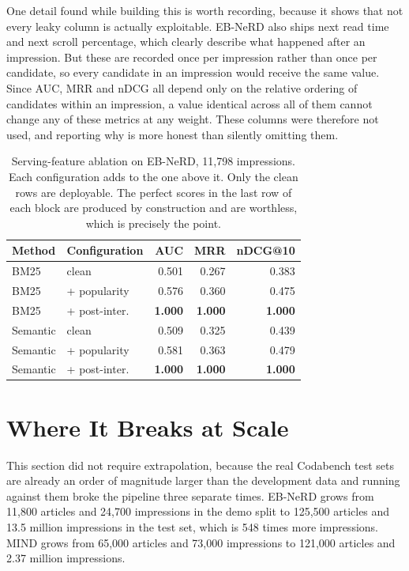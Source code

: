 \documentclass[11pt]{article}
\begin{document}
One detail found while building this is worth recording, because it shows that not every leaky
column is actually exploitable. EB-NeRD also ships next read time and next scroll percentage,
which clearly describe what happened after an impression. But these are recorded once per
impression rather than once per candidate, so every candidate in an impression would receive
the same value. Since AUC, MRR and nDCG all depend only on the relative ordering of candidates
within an impression, a value identical across all of them cannot change any of these metrics
at any weight. These columns were therefore not used, and reporting why is more honest than
silently omitting them.

\begin{table}[t]
\centering
\small
\begin{tabular}{llrrr}
\toprule
Method & Configuration & AUC & MRR & nDCG@10 \\
\midrule
BM25     & clean            & 0.501 & 0.267 & 0.383 \\
BM25     & + popularity     & 0.576 & 0.360 & 0.475 \\
BM25     & + post-inter.    & \textbf{1.000} & \textbf{1.000} & \textbf{1.000} \\
\midrule
Semantic & clean            & 0.509 & 0.325 & 0.439 \\
Semantic & + popularity     & 0.581 & 0.363 & 0.479 \\
Semantic & + post-inter.    & \textbf{1.000} & \textbf{1.000} & \textbf{1.000} \\
\bottomrule
\end{tabular}
\caption{Serving-feature ablation on EB-NeRD, 11,798 impressions. Each configuration adds to
the one above it. Only the clean rows are deployable. The perfect scores in the last row of
each block are produced by construction and are worthless, which is precisely the point.}
\label{tab:ablation}
\end{table}

\section{Where It Breaks at Scale}
\label{sec:scale}

This section did not require extrapolation, because the real Codabench test sets are already an
order of magnitude larger than the development data and running against them broke the pipeline
three separate times. EB-NeRD grows from 11,800 articles and 24,700 impressions in the demo
split to 125,500 articles and 13.5 million impressions in the test set, which is 548 times more
impressions. MIND grows from 65,000 articles and 73,000 impressions to 121,000 articles and
2.37 million impressions.
\end{document}
